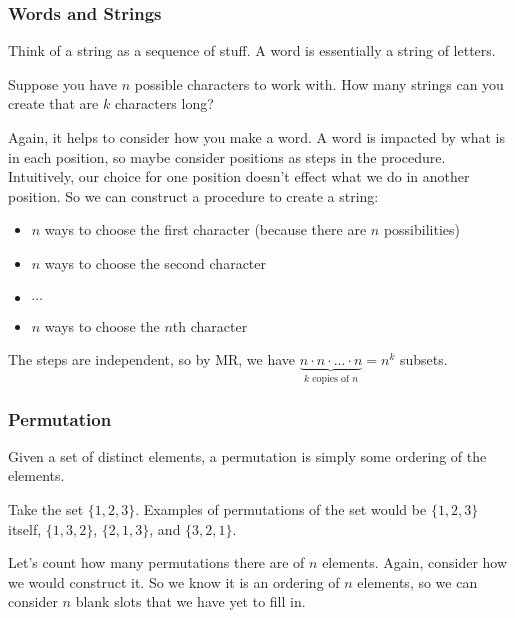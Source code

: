 \documentclass[11pt]{scrartcl}
\begin{document}
\subsubsection{Words and Strings}

Think of a string as a sequence of stuff. A word is essentially a string of letters.

Suppose you have $n$ possible characters to work with. How many strings can you create that are $k$ characters long?

Again, it helps to consider how you make a word. A word is impacted by what is in each position, so maybe consider positions as steps in the procedure.  Intuitively, our choice for one position doesn't effect what we do in another position. So we can construct a procedure to create a string:
\begin{itemize}
    \item $n$ ways to choose the first character (because there are $n$ possibilities)
    \item $n$ ways to choose the second character
    \item $\cdots$
    \item $n$ ways to choose the $n$th character
\end{itemize}
The steps are independent, so by MR, we have $\underbrace{n \cdot n \cdot ... \cdot n}_\text{$k$ copies of $n$} = n^k$ subsets.

\subsubsection{Permutation}

\begin{definition}[Permutation]
    Given a set of distinct elements, a permutation is simply some ordering of the elements.
\end{definition}
Take the set $\{1, 2, 3\}$. Examples of permutations of the set would be $\{1, 2, 3\}$ itself, $\{1, 3, 2\}$, $\{2, 1, 3\}$, and $\{3, 2, 1\}$.

Let's count how many permutations there are of $n$ elements. Again, consider how we would construct it. So we know it is an ordering of $n$ elements, so we can consider $n$ blank slots that we have yet to fill in.
\end{document}
